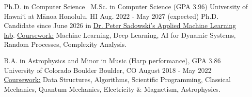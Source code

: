 \begin{cventries}

	\cventry
    {Ph.D. in Computer Science \textbar\ M.Sc. in Computer Science (GPA 3.96)}
    {University of Hawai`i at Mānoa}
    {Honolulu, HI}
    {Aug. 2022 - May 2027 (expected)}
    {
        Ph.D. Candidate since June 2026 in \href{https://peterjsadowski.github.io/}{Dr. Peter Sadowski's Applied Machine Learning lab}. \underline{Coursework:} Machine Learning, Deep Learning, AI for Dynamic Systems, Random Processes, Complexity Analysis.
	}

	\vspace{0.5mm}

	\cventry
	{B.A. in Astrophysics and Minor in Music (Harp performance), GPA 3.86}
	{University of Colorado Boulder}
	{Boulder, CO}
	{August 2018 - May 2022}
	{
        \underline{Coursework:} Data Structures, Algorithms, Scientific Programming, Classical Mechanics, Quantum Mechanics, Electricity \& Magnetism, Astrophysics.
	}

%

\vspace{-2mm}

\end{cventries}
